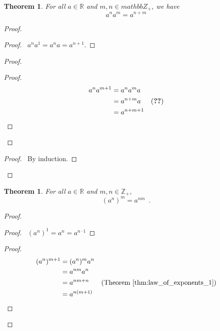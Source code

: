\documentclass{book}
\let\qed\relax
\newtheorem{thm}[ax]{Theorem}
\theoremstyle{definition}
\begin{document}
\begin{thm}
\label{thm:law_of_exponents_1}
For all $a \in \mathbb{R}$ and $m,n \in mathbb{Z}_+$, we have
\[ a^n a^m = a^{n+m} \]
\end{thm}

\begin{proof}
\pf
{}
\begin{proof}
	\pf\ $a^n a^1 = a^n a = a^{n+1}$.
\end{proof}
\begin{proof}
	\begin{proof}
		\pf
		\begin{align*}
			a^n a^{m+1} & = a^n a^m a \\
			& = a^{n+m} a & (\text{\stepref{b}}) \\
			& = a^{n+m+1}
		\end{align*}
	\end{proof}
\end{proof}
\qedstep
\begin{proof}
	\pf\ By induction.
\end{proof}
\qed
\end{proof}

\begin{thm}
For all $a \in \mathbb{R}$ and $m,n \in \mathbb{Z}_+$,
\[ (a^n)^m = a^{nm} \enspace . \]
\end{thm}

\begin{proof}
\pf
{}
\begin{proof}
	\pf\ $(a^n)^1 = a^n = a^{n \cdot 1}$
\end{proof}
\begin{proof}
	\pf
	\begin{align*}
		(a^n)^{m+1} & = (a^n)^m a^n \\
		& = a^{nm} a^n \\
		& = a^{nm+n} & (\text{Theorem \ref{thm:law_of_exponents_1}}) \\
		& = a^{n(m+1)}
	\end{align*}
\end{proof}
\qed
\end{proof}
\end{document}
